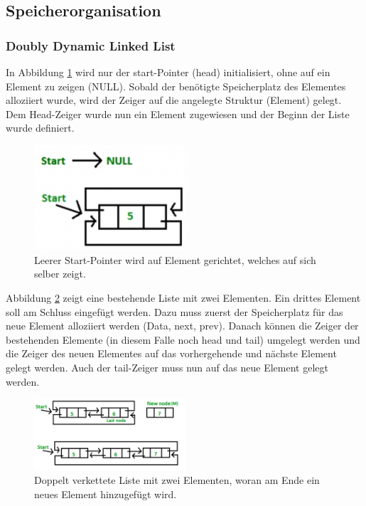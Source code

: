 \subsection{Speicherorganisation}

\subsubsection{Doubly Dynamic Linked List}\label{Appendix:Lists}

In Abbildung \ref{fig:Doubly_Linked_List_2_0} wird nur der start-Pointer (head) initialisiert, ohne auf ein Element zu zeigen (NULL). Sobald der benötigte Speicherplatz des Elementes alloziiert wurde, wird der Zeiger auf die angelegte Struktur (Element) gelegt. Dem Head-Zeiger wurde nun ein Element zugewiesen und der Beginn der Liste wurde definiert.

\begin{figure}[H]
	\centering
	\includegraphics[width=0.5\textwidth]{graphics/Doubly_Linked_List_2_0}
	\caption{Leerer Start-Pointer wird auf Element gerichtet, welches auf sich selber zeigt.\cite{kumar_doubly_2017}}
	\label{fig:Doubly_Linked_List_2_0}
\end{figure}

Abbildung \ref{fig:Doubly_Linked_List_2_1} zeigt eine bestehende Liste mit zwei Elementen. Ein drittes Element soll am Schluss eingefügt werden. Dazu muss zuerst der Speicherplatz für das neue Element alloziiert werden (Data, next, prev). Danach können die Zeiger der bestehenden Elemente (in diesem Falle noch head und tail) umgelegt werden und die Zeiger des neuen Elementes auf das vorhergehende und nächste Element gelegt werden. Auch der tail-Zeiger muss nun auf das neue Element gelegt werden.

\begin{figure}[H]
	\centering
	\includegraphics[width=0.5\textwidth]{graphics/Doubly_Linked_List_2_1}
	\caption{Doppelt verkettete Liste mit zwei Elementen, woran am Ende ein neues Element hinzugefügt wird.\cite{kumar_doubly_2017}}
	\label{fig:Doubly_Linked_List_2_1}
\end{figure}

